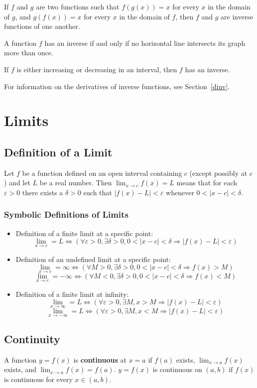 \documentclass{artikel3}
\begin{document}
If $f$ and $g$ are two functions such that $f(g(x))=x$ for every $x$ in 
the domain of $g$, and $g(f(x))=x$ for every $x$ in the domain of $f$, then
$f$ and $g$ are inverse functions of one another.

A function $f$ has an inverse if and only if no horizontal line intersects its graph more than once.

If $f$ is either increasing or decreasing in an interval, then $f$ has an inverse.

For information on the derivatives of inverse functions, see Section~\ref{dinv}.

\section{Limits}

\subsection{Definition of a Limit}
Let $f$ be a function defined on an open interval containing $c$ 
(except possibly at $c$) and let $L$ be a real number.
Then $\lim_{x \to c} f(x)=L$ means that for each $\varepsilon >0$
there exists a $\delta >0$ such that $|f(x)-L|<\varepsilon$ whenever
$0<|x-c|<\delta$.

\subsubsection{Symbolic Definitions of Limits}
\begin{itemize}
\item{Definition of a finite limit at a specific point:
\[ \lim_{x \to c}=L\Leftrightarrow (\forall\varepsilon >0, \exists\delta >0, 
0<|x-c|<\delta \Rightarrow |f(x)-L|<\varepsilon)\]}
\item{Definition of an undefined limit at a specific point:
\[ \lim_{x \to c}=\infty\Leftrightarrow (\forall M>0, \exists\delta >0,
0<|x-c|<\delta\Rightarrow f(x)>M)\]
\[ \lim_{x \to c}=-\infty\Leftrightarrow (\forall M<0, \exists\delta >0,
0<|x-c|<\delta\Rightarrow f(x)<M)\]}
\item{Definition of a finite limit at infinity:
\[ \lim_{x \to \infty}=L\Leftrightarrow (\forall\varepsilon>0,\exists M,
x>M\Rightarrow|f(x)-L|<\varepsilon) \]
\[ \lim_{x \to -\infty}=L\Leftrightarrow (\forall\varepsilon>0,\exists M,
x<M\Rightarrow|f(x)-L|<\varepsilon) \]}
\end{itemize}

\subsection{Continuity}
A function $y=f(x)$ is \textbf{continuous} at $x=a$ if $f(a)$ exists, 
$\displaystyle\lim_{x \to a}f(x)$ exists, and $\displaystyle\lim_{x \to a}f(x)=f(a)$.
$y=f(x)$ is continuous on $(a,b)$ if $f(x)$ is continuous for every
$x\in(a,b)$.
\end{document}

